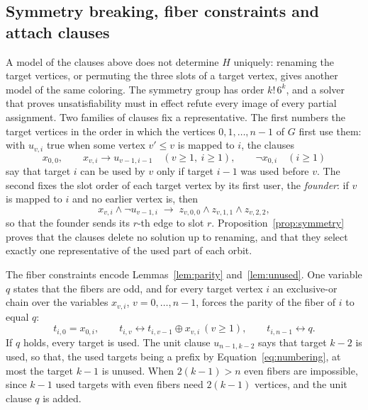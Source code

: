 
\subsection{Symmetry breaking, fiber constraints and attach clauses}\label{sec:symmetry}

A model of the clauses above does not determine $H$ uniquely: renaming the target vertices, or permuting the three slots of a target vertex, gives another model of the same
coloring. The symmetry group has order $k!\,6^k$, and a solver that proves unsatisfiability must in effect refute every image of every partial assignment. Two families of
clauses fix a representative. The first numbers the target vertices in the order in which the vertices $0, 1, \dots, n-1$ of $G$ first use them: with
$u_{v,i}$ true when some vertex $v' \le v$ is mapped to $i$, the clauses
\begin{equation}\label{eq:numbering}
x_{0,0}, \qquad x_{v,i} \to u_{v-1,i-1} \quad (v \ge 1,\ i \ge 1), \qquad \neg x_{0,i} \quad (i \ge 1)
\end{equation}
say that target $i$ can be used by $v$ only if target $i-1$ was used before $v$. The second fixes the slot order of each target vertex by its first user, the
\emph{founder}: if $v$ is mapped to $i$ and no earlier vertex is, then
\begin{equation}\label{eq:founder}
x_{v,i} \wedge \neg u_{v-1,i} \;\to\; z_{v,0,0} \wedge z_{v,1,1} \wedge z_{v,2,2},
\end{equation}
so that the founder sends its $r$-th edge to slot $r$. Proposition~\ref{prop:symmetry} proves that the clauses delete no solution up to renaming, and that they select
exactly one representative of the used part of each orbit.

The fiber constraints encode Lemmas~\ref{lem:parity} and~\ref{lem:unused}. One variable $q$ states that the fibers are odd, and for every target vertex $i$ an exclusive-or
chain over the variables $x_{v,i}$, $v = 0, \dots, n-1$, forces the parity of the fiber of $i$ to equal $q$:
\begin{equation}\label{eq:xor}
t_{i,0} = x_{0,i},\qquad t_{i,v} \leftrightarrow t_{i,v-1} \oplus x_{v,i}\ (v \ge 1),\qquad t_{i,n-1} \leftrightarrow q.
\end{equation}
If $q$ holds, every target is used. The unit clause $u_{n-1,k-2}$ says that target $k-2$ is used, so that, the used targets being a prefix by Equation~\eqref{eq:numbering},
at most the target $k-1$ is unused. When $2(k-1) > n$ even fibers are impossible, since $k-1$ used targets with even fibers need $2(k-1)$ vertices, and the unit clause $q$ is added.

